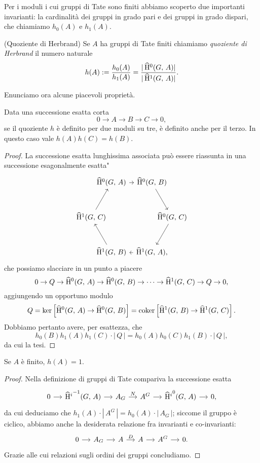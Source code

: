 Per i moduli i cui gruppi di Tate sono finiti abbiamo scoperto due importanti invarianti: la cardinalità dei gruppi in grado pari e dei gruppi in grado dispari, che chiamiamo $ h_0(A) $ e $ h_1(A) $.

\begin{definition}(Quoziente di Herbrand)
	Se $ A $ ha gruppi di Tate finiti chiamiamo \emph{quoziente di Herbrand} il numero naturale
	\[ {h}(A) := \frac{h_0(A)}{h_1(A)} = \frac{|\operatorname{\widehat{H}^{0}}(G, \, A)|}{|\operatorname{\widehat{H}^{1}}(G, \, A)|}. \]
\end{definition}

Enunciamo ora alcune piacevoli proprietà.

\begin{lemma}\label{Herb1}
	Data una successione esatta corta
	\[ 0 \to A \to B \to C \to 0, \]
	se il quoziente $ h $ è definito per due moduli su tre, è definito anche per il terzo. In questo caso vale $ h(A)h(C) = h(B) $.
\end{lemma}
\begin{proof}
	La successione esatta lunghissima associata può essere riassunta in una successione \leftquote esagonalmente esatta"
	\[\begin{tikzcd}[column sep={1cm,between origins}, row sep={1.732050808cm,between origins}]
	& \Hhz(G, \, A) \arrow[rr] && \Hhz(G, \, B) \arrow[rd] &  \\
	\Hhu(G, \, C) \arrow[ru]&  &&  & \Hhz(G, \, C) \arrow[ld] \\				& \Hhu(G, \, B) \arrow[lu] && \Hhu(G, \, A) \arrow[ll], & 
	\end{tikzcd}\]
	che possiamo slacciare in un punto a piacere
	\[ 0 \to Q \to \operatorname{\widehat{H}^{0}}(G, \, A) \to \operatorname{\widehat{H}^{0}}(G, \, B) \to \dots \to \operatorname{\widehat{H}^{1}}(G, \, C) \to Q \to 0, \]
	aggiungendo un opportuno modulo $$  Q = \ker \left[\operatorname{\widehat{H}^{0}}(G, \, A) \to \operatorname{\widehat{H}^{0}}(G, \, B)\right] = \operatorname{coker}\left[ \operatorname{\widehat{H}^{1}}(G, \, B) \to \operatorname{\widehat{H}^{1}}(G, \, C) \right].  $$
	Dobbiamo pertanto avere, per esattezza, che
	\[  h_0(B) h_1(A) h_1(C) \cdot |\,Q\,| = h_0(A) h_0(C) h_1(B) \cdot |\,Q\,|, \]			da cui la tesi.
\end{proof}

\begin{lemma}\label{Herb2}
	Se $ A $ è finito, $ h(A) = 1 $.
\end{lemma}
\begin{proof}
	Nella definizione di gruppi di Tate compariva la successione esatta
	\begin{equation*}			\begin{tikzcd}[column sep = small]
	0 \rar& \Hh^{-1}(G, \, A) \rar& A_G \rar["N"]& A^G \rar&\Hh^0(G, \, A) \rar& 0,
	\end{tikzcd}
	\end{equation*}
	da cui deduciamo che $ h_1(A) \cdot |\, A^G\, | =  h_0(A) \cdot |\, A_G\, | $; siccome il gruppo è ciclico, abbiamo anche la desiderata relazione fra invarianti e co-invarianti:
	\begin{equation*}
	\begin{tikzcd}[column sep = small]
	0 \rar& A_G \rar& A \rar["D"]& A \rar& A^G \rar& 0.
	\end{tikzcd}
	\end{equation*}
	Grazie alle cui relazioni sugli ordini dei gruppi concludiamo.
\end{proof}


